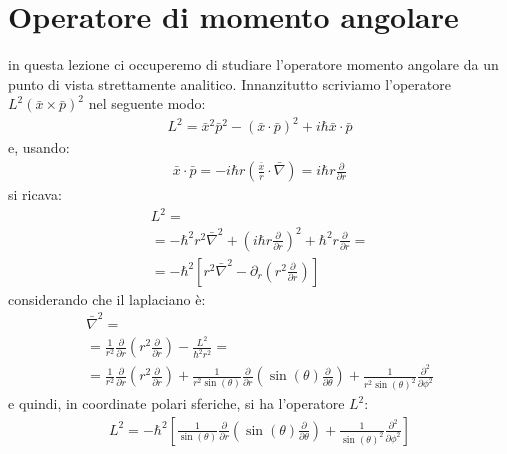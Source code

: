 \section{Operatore di momento angolare} %
in questa lezione ci occuperemo di studiare l'operatore momento angolare da un punto di vista strettamente analitico. 
Innanzitutto scriviamo l'operatore $L^2\left(\bar x\times \bar p\right)^2$ nel seguente modo:
\begin{equation}\begin{split}
L^2=\bar x^2\bar p^2-\left(\bar x\cdot \bar p\right)^2+i\hbar \bar x\cdot \bar p
\end{split}\end{equation}
e, usando:
\begin{equation}\begin{split}
\bar x\cdot \bar p=-i\hbar r\left(\frac{\bar x}{r}\cdot \bar \nabla \right)=i\hbar r\frac{\partial }{\partial r}
\end{split}\end{equation}
si ricava:
\begin{equation}\begin{split}
L^2=\\
=-\hbar ^2r^2\bar \nabla ^2+\left(i\hbar r\frac{\partial }{\partial r}\right)^2+\hbar ^2r\frac{\partial }{\partial r}=\\
=-\hbar ^2\left[r^2\bar \nabla ^2-\partial _r\left(r^2\frac{\partial }{\partial r}\right)\right]
\end{split}\end{equation}
considerando che il laplaciano è:
\begin{equation}\begin{split}
\bar \nabla ^2=\\
=\frac{1}{r^2}\frac{\partial }{\partial r}\left(r^2\frac{\partial }{\partial r}\right)-\frac{L^2}{\hbar ^2r^2}=\\
=\frac{1}{r^2}\frac{\partial }{\partial r}\left(r^2\frac{\partial }{\partial r}\right)+\frac{1}{r^2\sin{\left(\theta\right)}}\frac{\partial }{\partial r}\left(\sin{\left(\theta\right)}\frac{\partial }{\partial \theta}\right)+\frac{1}{r^2\sin{\left(\theta\right)}^2}\frac{\partial ^2}{\partial \phi^2}
\end{split}\end{equation}
e quindi, in coordinate polari sferiche, si ha l'operatore $L^2$:
\begin{equation}\begin{split}
L^2=-\hbar ^2\left[\frac{1}{\sin{\left(\theta\right)}}\frac{\partial }{\partial r}\left(\sin{\left(\theta\right)}\frac{\partial }{\partial \theta}\right)+\frac{1}{\sin{\left(\theta\right)}^2}\frac{\partial ^2}{\partial \phi^2}\right]
\end{split}\end{equation}

